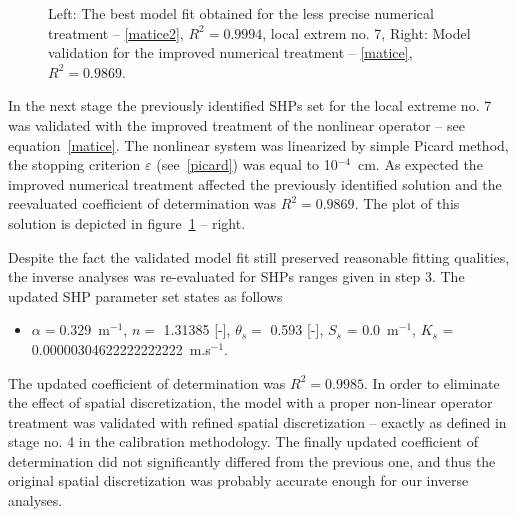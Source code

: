 \documentclass[review]{myarticle}
\begin{document}
\begin{figure}
  \hfill
  \begin{minipage}[t]{.45\textwidth}
    \begin{center}  
\end{center}
\end{minipage} 
\begin{minipage}[t]{.45\textwidth}
 \begin{center} 
\end{center}
\end{minipage}
\caption{Left: The best model fit obtained for the less precise numerical treatment -- \eqref{matice2}, $R^2= 0.9994$, local extrem no. 7, Right: Model validation for the improved numerical treatment -- \eqref{matice}, $R^2= 0.9869$. }
\label{fits}       %
\end{figure}

In the next stage the previously identified SHPs set for the local extreme no. 7  was validated with the improved treatment of the nonlinear operator -- see equation~\eqref{matice}. The nonlinear system was linearized by simple Picard method, the stopping criterion $\varepsilon$ (see~\eqref{picard}) was equal to 10$^{-4}$~cm. As expected the improved numerical treatment affected the previously identified solution and the reevaluated coefficient of determination was $R^2=0.9869$. The plot of this solution is depicted in figure~\ref{fits} -- right.

Despite the fact the validated model fit still preserved reasonable fitting qualities, the inverse analyses was re-evaluated for SHPs ranges given in step 3. The updated SHP parameter set states as follows
\begin{itemize}
\item  $\alpha= 0.329$~m$^{-1}$, $n=$            1.31385 [-],  $\theta_s=$  0.593 [-], $S_s$ = 0.0~m$^{-1}$, $K_s$ = \num{.00000304622222222222}~m.s$^{-1}$.
\end{itemize}
The updated coefficient of determination was $R^2=0.9985$. In order to eliminate the effect of spatial discretization, the model with a proper non-linear operator treatment was validated with refined spatial discretization -- exactly as defined in stage no. 4 in the calibration methodology. The finally updated coefficient of determination did not significantly differed from the previous one, and thus the original spatial discretization was probably accurate enough for our inverse analyses.
\end{document}
